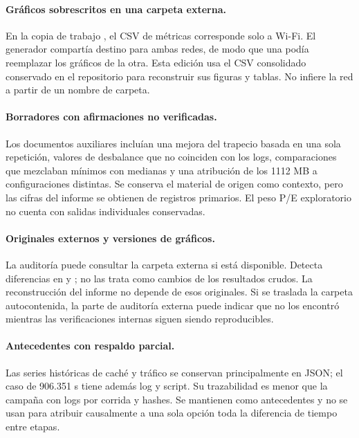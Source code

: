 \paragraph{Gráficos sobrescritos en una carpeta externa.} En la copia de trabajo , el CSV de métricas corresponde solo a Wi-Fi. El generador compartía destino para ambas redes, de modo que una podía reemplazar los gráficos de la otra. Esta edición usa el CSV consolidado conservado en el repositorio para reconstruir sus figuras y tablas. No infiere la red a partir de un nombre de carpeta.

\paragraph{Borradores con afirmaciones no verificadas.} Los documentos auxiliares incluían una mejora del trapecio basada en una sola repetición, valores de desbalance que no coinciden con los logs, comparaciones que mezclaban mínimos con medianas y una atribución de los 1112 MB a configuraciones distintas. Se conserva el material de origen como contexto, pero las cifras del informe se obtienen de registros primarios. El peso P/E exploratorio no cuenta con salidas individuales conservadas.

\paragraph{Originales externos y versiones de gráficos.} La auditoría puede consultar la carpeta externa  si está disponible. Detecta diferencias en  y ; no las trata como cambios de los resultados crudos. La reconstrucción del informe no depende de esos originales. Si se traslada la carpeta autocontenida, la parte de auditoría externa puede indicar que no los encontró mientras las verificaciones internas siguen siendo reproducibles.

\paragraph{Antecedentes con respaldo parcial.} Las series históricas de caché y tráfico se conservan principalmente en JSON; el caso de 906.351 s tiene además log y script. Su trazabilidad es menor que la campaña con logs por corrida y hashes. Se mantienen como antecedentes y no se usan para atribuir causalmente a una sola opción toda la diferencia de tiempo entre etapas.
